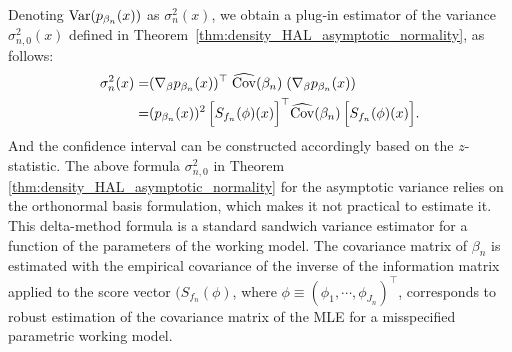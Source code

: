 Denoting $\mathrm{Var}(p_{\beta_n}(x))$ as $\sigma^2_{n}(x)$, we obtain a plug‑in estimator of the variance \(\sigma^2_{n,0}(x)\) defined in Theorem~\ref{thm:density_HAL_asymptotic_normality}, as follows:
\begin{align} \label{eq:delta-method-variance-estimator}
\sigma_n^2(x)
=& (\nabla_\beta p_{\beta_n}(x))^\top
\; \widehat{\mathrm{Cov}}(\beta_n)\;
(\nabla_\beta p_{\beta_n}(x)) \nonumber \\
=& (p_{\beta_n}(x))^2\,
\Bigl[S_{f_n}(\phi)(x)\Bigr]^\top 
\widehat{\mathrm{Cov}}(\beta_n)\,
\Bigl[S_{f_n}(\phi)(x)\Bigr]. 
\end{align}
And the confidence interval can be constructed accordingly based on the $z$-statistic.
The above formula $\sigma^2_{n,0}$ in Theorem \ref{thm:density_HAL_asymptotic_normality} for the asymptotic variance relies on the orthonormal basis formulation, which makes it not practical to estimate it. This delta-method formula is a standard sandwich variance estimator for a function of the parameters of the working model. The covariance matrix of $\beta_n$ is estimated with the empirical covariance of the inverse of the information matrix applied to the score vector $(S_{f_n}(\phi)$, where $\phi \equiv (\phi_1, \cdots, \phi_{J_n})^\top$, corresponds to robust estimation of the covariance matrix of the MLE for a misspecified parametric working model.
